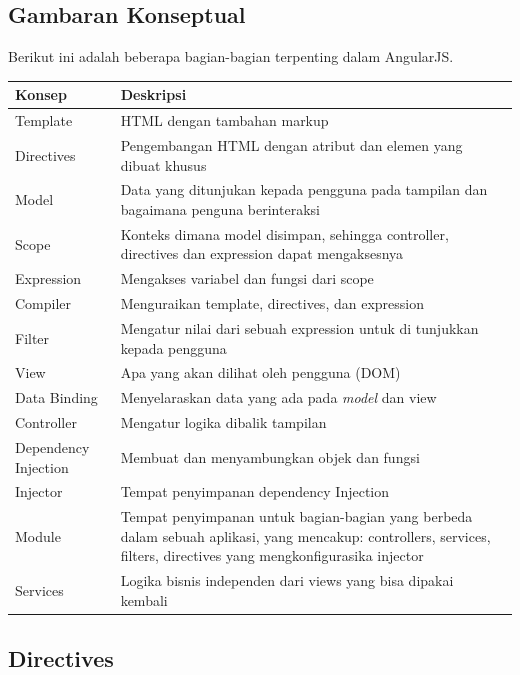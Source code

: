 	\subsection{Gambaran Konseptual}
	\label{sub: gambaranKonsep}
		Berikut ini adalah beberapa bagian-bagian terpenting dalam AngularJS.
		\begin{center}
			\begin{tabular}{| m{5cm} | m{10cm} |}
				\hline
				Konsep & Deskripsi \\
				\hline
				Template & HTML dengan tambahan markup \\
				\hline
				Directives & Pengembangan HTML dengan atribut dan elemen yang dibuat khusus \\
				\hline
				Model & Data yang ditunjukan kepada pengguna pada tampilan dan bagaimana penguna berinteraksi \\
				\hline
				Scope & Konteks dimana model disimpan, sehingga controller, directives dan expression dapat mengaksesnya \\
				\hline
				Expression & Mengakses variabel dan fungsi dari scope \\
				\hline
				Compiler & Menguraikan template, directives, dan expression \\
				\hline
				Filter & Mengatur nilai dari sebuah expression untuk di tunjukkan kepada pengguna \\
				\hline
				View & Apa yang akan dilihat oleh pengguna (DOM) \\
				\hline
				Data Binding & Menyelaraskan data yang ada pada \textit{model} dan view \\
				\hline
				Controller & Mengatur logika dibalik tampilan \\
				\hline
				Dependency Injection & Membuat dan menyambungkan objek dan fungsi \\
				\hline
				Injector & Tempat penyimpanan dependency Injection \\
				\hline
				Module & Tempat penyimpanan untuk bagian-bagian yang berbeda dalam sebuah aplikasi, yang mencakup: controllers, services, filters, directives yang mengkonfigurasika injector \\
				\hline
				Services & Logika bisnis independen dari views yang bisa dipakai kembali  \\
				\hline
				\end{tabular}
			\end{center}
			
	\subsection{Directives}
	\label{sub: directives}
	
